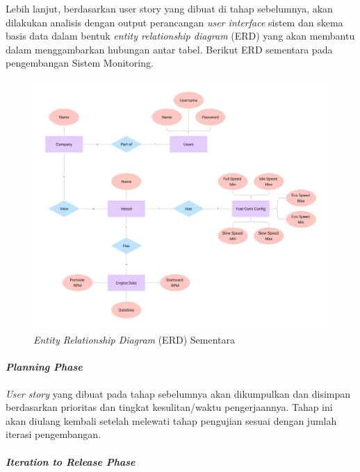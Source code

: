     Lebih lanjut, berdasarkan user story yang dibuat di tahap sebelumnya, akan dilakukan analisis dengan output perancangan \textit{user interface} sistem dan skema basis data dalam bentuk \textit{entity relationship diagram} (ERD) yang akan membantu dalam menggambarkan hubungan antar tabel. Berikut ERD sementara pada pengembangan Sistem Monitoring.


    \begin{figure}[!h]
        \includegraphics[width=1\linewidth, center]{images/metode/erd.png}
        \caption{\textit{Entity Relationship Diagram} (ERD) Sementara}
        \label{fig:erd}
    \end{figure}

    \paragraph{\textit{Planning Phase}}

    \textit{User story} yang dibuat pada tahap sebelumnya akan dikumpulkan dan disimpan berdasarkan prioritas dan tingkat kesulitan/waktu pengerjaannya. Tahap ini akan diulang kembali setelah melewati tahap pengujian sesuai dengan jumlah iterasi pengembangan.

    \paragraph{\textit{Iteration to Release Phase}}

